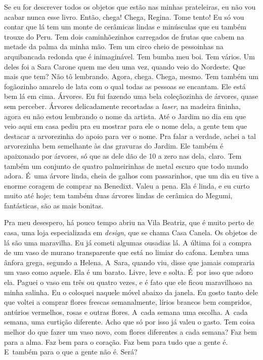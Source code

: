 Se eu for descrever todos os objetos que estão nas minhas prateleiras,
eu não vou acabar nunca esse livro. Então, chega! Chega, Regina. Tome
tento! Eu só vou contar que lá tem um monte de cerâmicas lindas e
minúsculas que eu também trouxe do Peru. Tem dois caminhõezinhos
carregados de frutas que cabem na metade da palma da minha mão. Tem um
circo cheio de pessoinhas na arquibancada redonda que é inimaginável.
Tem bumba meu boi. Tem vários. Um deles foi a Sara Carone quem me deu
uma vez, quando veio do Nordeste. Que mais que tem? Não tô lembrando.
Agora, chega. Chega, mesmo. Tem também um fogãozinho amarelo de lata com
o qual todas as pessoas se encantam. Ele está bem lá em cima. Árvores.
Eu fui fazendo uma bela coleçãozinha de árvores, quase sem perceber.
Árvores delicadamente recortadas a \emph{laser}, na madeira fininha,
agora eu não estou lembrando o nome da artista. Até o Jardim no dia em
que veio aqui em casa pediu pra eu mostrar para ele o nome dela, a gente
tem que destacar a arvorezinha do apoio para ver o nome. Pra falar a
verdade, achei a tal arvorezinha bem semelhante às das gravuras do
Jardim. Ele também é apaixonado por árvores, só que as dele dão de 10 a
zero nas dela, claro. Tem também um conjunto de quatro palmeirinhas de
metal escuro que todo mundo adora. É~uma árvore linda, cheia de galhos
com passarinhos, que um dia eu tive a enorme coragem de comprar na
Benedixt. Valeu a pena. Ela é linda, e eu curto muito até hoje; tem
também duas árvores lindas de cerâmica do Megumi, fantásticas, são as
mais bonitas.

Pra meu desespero, há pouco tempo abriu na Vila Beatriz, que é muito
perto de casa, uma loja especializada em \emph{design}, que se chama
Casa Canela. Os objetos de lá são uma maravilha. Eu já cometi algumas
ousadias lá. A última foi a compra de um vaso de murano transparente que
está no limiar do cafona. Lembra uma ânfora grega, segundo a Helena. A~Sara, quando viu, disse que jamais compraria um vaso como aquele. Ela é
um barato. Livre, leve e solta. É~por isso que adoro ela. Paguei o vaso
em três ou quatro vezes, e é fato que ele ficou maravilhoso na minha
salinha. Eu o coloquei naquele móvel abaixo da janela. Eu gosto tanto
dele que voltei a comprar flores frescas semanalmente, lírios brancos
bem compridos, antúrios vermelhos, rosas e outras flores. A~cada semana
uma escolha. A~cada semana, uma curtição diferente. Acho que só por isso
já valeu o gasto. Tem coisa melhor do que fazer um vaso novo, com flores
diferentes a cada semana? Faz bem para a alma. Faz bem para o coração.
Faz bem para tudo que a gente é. E~também para o que a gente não é.
Será?

